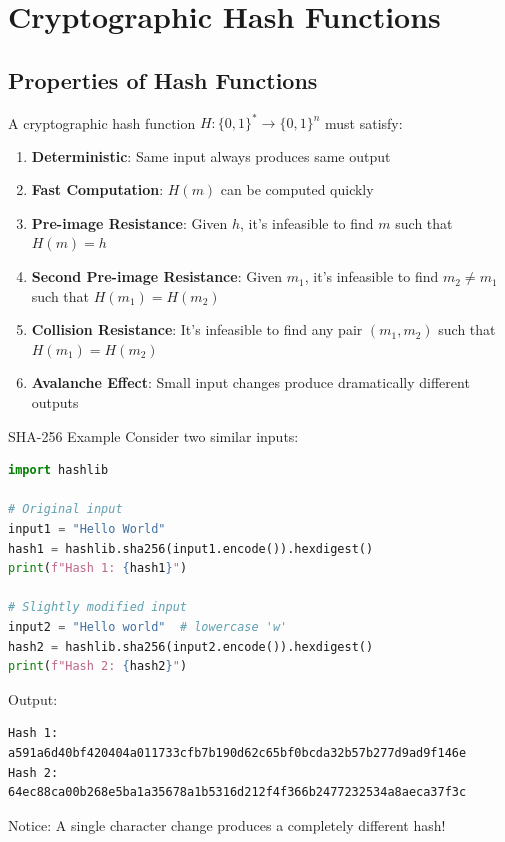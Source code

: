 \documentclass[11pt,a4paper]{article}
\begin{document}
\section{Cryptographic Hash Functions}

\subsection{Properties of Hash Functions}

A cryptographic hash function $H: \{0,1\}^* \rightarrow \{0,1\}^n$ must satisfy:

\begin{enumerate}
  \item \textbf{Deterministic}: Same input always produces same output
  \item \textbf{Fast Computation}: $H(m)$ can be computed quickly
  \item \textbf{Pre-image Resistance}: Given $h$, it's infeasible to find $m$ such that $H(m) = h$
  \item \textbf{Second Pre-image Resistance}: Given $m_1$, it's infeasible to find $m_2 \neq m_1$ such that $H(m_1) = H(m_2)$
  \item \textbf{Collision Resistance}: It's infeasible to find any pair $(m_1, m_2)$ such that $H(m_1) = H(m_2)$
  \item \textbf{Avalanche Effect}: Small input changes produce dramatically different outputs
\end{enumerate}

\begin{examplebox}{SHA-256 Example}
Consider two similar inputs:
\begin{lstlisting}[language=Python]
import hashlib

# Original input
input1 = "Hello World"
hash1 = hashlib.sha256(input1.encode()).hexdigest()
print(f"Hash 1: {hash1}")

# Slightly modified input
input2 = "Hello world"  # lowercase 'w'
hash2 = hashlib.sha256(input2.encode()).hexdigest()
print(f"Hash 2: {hash2}")
\end{lstlisting}

Output:
\begin{verbatim}
Hash 1: a591a6d40bf420404a011733cfb7b190d62c65bf0bcda32b57b277d9ad9f146e
Hash 2: 64ec88ca00b268e5ba1a35678a1b5316d212f4f366b2477232534a8aeca37f3c
\end{verbatim}

Notice: A single character change produces a completely different hash!
\end{examplebox}
\end{document}
